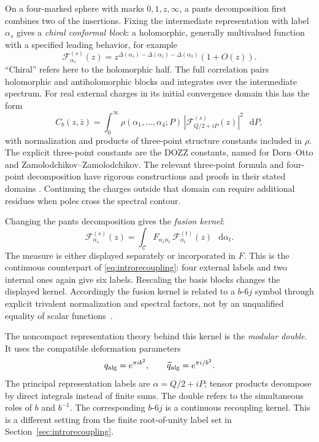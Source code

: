 \documentclass[11pt,a4paper]{article}
\numberwithin{equation}{section}
\theoremstyle{definition}
\theoremstyle{remark}
\newcommand{\dd}{\mathop{}\!\mathrm d}
\begin{document}
On a four-marked sphere with marks $0,1,z,\infty$, a pants
decomposition first combines two of the insertions. Fixing the
intermediate representation with label $\alpha_s$ gives a
\emph{chiral conformal block}: a holomorphic, generally
multivalued function with a specified leading behavior, for example
\[
 \mathcal F^{(s)}_{\alpha_s}(z)
       =z^{\Delta(\alpha_s)-\Delta(\alpha_1)-\Delta(\alpha_3)}
                       (1+O(z)).
\]
``Chiral'' refers here to the holomorphic half. The full
correlation pairs holomorphic and antiholomorphic blocks and
integrates over the intermediate spectrum. For real external
charges in its initial convergence domain this has the form
\[
 C_b(z,\bar z)=\int_0^\infty
    \rho(\alpha_1,\ldots,\alpha_4;P)\,
    |\mathcal F^{(s)}_{Q/2+iP}(z)|^2\,\dd P,
\]
with normalization and products of three-point structure constants
included in $\rho$. The explicit three-point constants are the
DOZZ constants, named for Dorn--Otto and Zamolodchikov--Zamolodchikov.
The relevant three-point formula and four-point decomposition have
rigorous constructions and proofs in their stated domains
\cite{KRV,GKRVBootstrap}. Continuing the charges outside that domain
can require additional residues when poles cross the spectral contour.

Changing the pants decomposition gives the \emph{fusion kernel}:
\begin{equation}
 \mathcal F^{(s)}_{\alpha_s}(z)
   =\int_{\mathcal C} F_{\alpha_s\alpha_t}\,
             \mathcal F^{(t)}_{\alpha_t}(z)\,\dd\alpha_t.
 \label{eq:introfusion}
\end{equation}
The measure is either displayed separately or incorporated in $F$.
This is the continuous counterpart of
\eqref{eq:introrecoupling}: four external labels and two internal
ones again give six labels. Rescaling the basis blocks changes
the displayed kernel. Accordingly the fusion kernel is related
to a $b$-$6j$ symbol through explicit trivalent normalization and
spectral factors, not by an unqualified equality of scalar
functions~\cite[Section 4]{TeschnerVartanov}.

The noncompact representation theory behind this kernel is the
\emph{modular double}. It uses the compatible deformation parameters
\[
 q_{\rm alg}=e^{\pi i b^2},\qquad
 \widetilde q_{\rm alg}=e^{\pi i/b^2}.
\]
The principal representation labels are $\alpha=Q/2+iP$; tensor
products decompose by direct integrals instead of finite sums.
The double refers to the simultaneous roles of $b$ and $b^{-1}$.
The corresponding $b$-$6j$ is a continuous recoupling kernel.
This is a different setting from the finite root-of-unity label
set in Section~\ref{sec:introrecoupling}.
\end{document}
